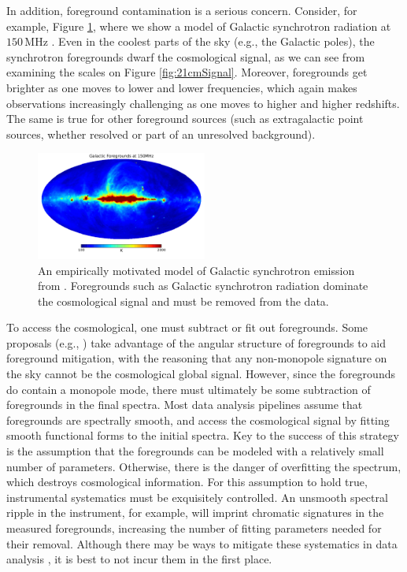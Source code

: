 \documentclass[twocolumn,apj,numberedappendix]{emulateapj}
\begin{document}
In addition, foreground contamination is a serious concern. Consider, for example, Figure \ref{fig:GSM}, where we show a model of Galactic synchrotron radiation at $150\,\textrm{MHz}$ \citep{angelicaGSM}. Even in the coolest parts of the sky (e.g., the Galactic poles), the synchrotron foregrounds dwarf the cosmological signal, as we can see from examining the scales on Figure \ref{fig:21cmSignal}. Moreover, foregrounds get brighter as one moves to lower and lower frequencies, which again makes observations increasingly challenging as one moves to higher and higher redshifts. The same is true for other foreground sources (such as extragalactic point sources, whether resolved or part of an unresolved background).

\begin{figure}[!]
	\centering
	\includegraphics[width=0.5\textwidth]{figures/Haslam_150MHz.pdf}
	\caption{An empirically motivated model of Galactic synchrotron emission from \citet{angelicaGSM}. Foregrounds such as Galactic synchrotron radiation dominate the cosmological signal and must be removed from the data.}
	\label{fig:GSM}
\end{figure}


To access the cosmological, one must subtract or fit out foregrounds. Some proposals (e.g., \citealt{L13}) take advantage of the angular structure of foregrounds to aid foreground mitigation, with the reasoning that any non-monopole signature on the sky cannot be the cosmological global signal. However, since the foregrounds do contain a monopole mode, there must ultimately be some subtraction of foregrounds in the final spectra. Most data analysis pipelines assume that foregrounds are spectrally smooth, and access the cosmological signal by fitting smooth functional forms to the initial spectra. Key to the success of this strategy is the assumption that the foregrounds can be modeled with a relatively small number of parameters. Otherwise, there is the danger of overfitting the spectrum, which destroys cosmological information. For this assumption to hold true, instrumental systematics must be exquisitely controlled. An unsmooth spectral ripple in the instrument, for example, will imprint chromatic signatures in the measured foregrounds, increasing the number of fitting parameters needed for their removal. Although there may be ways to mitigate these systematics in data analysis \citep{Liu_Switzer_2014}, it is best to not incur them in the first place.
\end{document}

